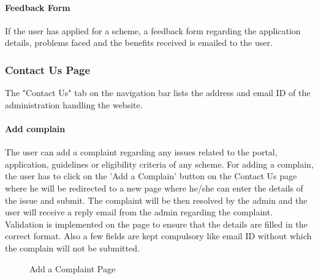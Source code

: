 \documentclass[conference]{IEEEtran}
\begin{document}
\paragraph{Feedback Form}
If the user has applied for a scheme, a feedback form regarding the application details, problems faced and the benefits received is emailed to the user.

\subsubsection{Contact Us Page}
The "Contact Us" tab on the navigation bar lists the address and email ID of the administration handling the website. 
\paragraph{Add complain}
The user can add a complaint regarding any issues related to the portal, application, guidelines or eligibility criteria of any scheme. For adding a complain, the user has to click on the 'Add a Complain' button on the Contact Us page where he will be redirected to a new page where he/she can enter the details of the issue and submit. The complaint will be then resolved by the admin and the user will receive a reply email from the admin regarding the complaint. Validation is implemented on the page to ensure that the details are filled in the correct format. Also a few fields are kept compulsory like email ID without which the complain will not be submitted.
\begin{figure}[h!]
\centering
{}
\caption{Add a Complaint Page}
\end{figure}
\end{document}
